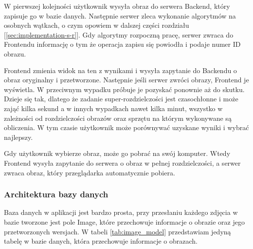 W pierwszej kolejności użytkownik wysyła obraz do serwera Backend, który zapisuje go w bazie danych. Następnie serwer zleca wykonanie algorytmów na osobnych wątkach, o czym opowiem w dalszej części rozdziału [\ref{sec:implementation-s-r}]. Gdy algorytmy rozpoczną pracę, serwer zwraca do Frontendu informację o tym że operacja zapisu się powiodła i podaje numer ID obrazu. 

Frontend zmienia widok na ten z wynikami i wysyła zapytanie do Backendu o obraz oryginalny i przetworzone. Następnie jeśli serwer zwróci obrazy, Frontend je wyświetla. W przeciwnym wypadku próbuje je pozyskać ponownie aż do skutku. Dzieje się tak, dlatego że zadanie super-rozdzielczości jest czasochłonne i może zająć kilka sekund a w innych wypadkach nawet kilka minut, wszystko w zależności od rozdzielczości obrazów oraz sprzętu na którym wykonywane są obliczenia. W tym czasie użytkownik może porównywać uzyskane wyniki i wybrać najlepszy. 

Gdy użytkownik wybierze obraz, może go pobrać na swój komputer. Wtedy Frontend wysyła zapytanie do serwera o obraz w pełnej rozdzielczości, a serwer zwraca obraz, który przeglądarka automatycznie pobiera.

\subsubsection*{Architektura bazy danych}

Baza danych w aplikacji jest bardzo prosta, przy przesłaniu każdego zdjęcia w bazie tworzone jest pole Image, które przechowuje informacje o obrazie oraz jego przetworzonych wersjach. W tabeli \ref{tab:image_model} przedstawiam jedyną tabelę w bazie danych, która przechowuje informacje o obrazach.

